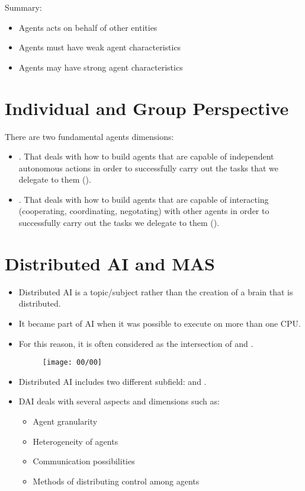 \vfill
Summary:
\begin{itemize}
\item Agents acts on behalf of other entities
\item Agents must have weak agent characteristics
\item Agents may have strong agent characteristics
\end{itemize}

\section{Individual and Group Perspective}
There are two fundamental agents dimensions:
\begin{itemize}
\item {}. That deals with how to  build agents that are capable of independent autonomous actions in order to successfully carry out the tasks that we delegate to them ().
\item {}. That deals with how to build agents that are capable of interacting (cooperating, coordinating, negotating) with other agents in order to successfully carry out the tasks we delegate to them ().
\end{itemize}

\section{Distributed AI and MAS}
\begin{itemize}
\item Distributed AI is a topic/subject rather than the creation of a brain that is distributed.
\item It became part of AI when it was possible to execute on more than one CPU.
\item For this reason, it is often considered as the intersection of  and .

\begin{figure}[!h]
\centering
\texttt{[image: 00/00]}
\end{figure}

\item Distributed AI includes two different subfield:  and .
\item DAI deals with several aspects and dimensions such as:
\begin{itemize}
\item Agent granularity
\item Heterogeneity of agents
\item Communication possibilities
\item Methods of distributing control among agents
\end{itemize}
\end{itemize}


